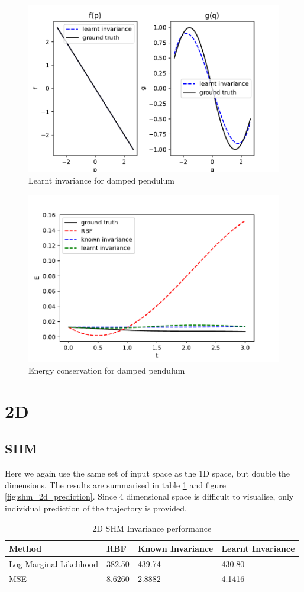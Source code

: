 \documentclass{statsmsc}
\begin{document}
\begin{figure}[H] 
  \includegraphics[width=0.6\linewidth]{../codes/figures/damped_pendulum_learnt.pdf}
  \centering
  \caption{Learnt invariance for damped pendulum}
  \label{fig:damped_pendulum_learnt}
\end{figure}

\begin{figure}[H] 
  \includegraphics[width=0.6\linewidth]{../codes/figures/damped_pendulum_energy.pdf}
  \centering
  \caption{Energy conservation for damped pendulum}
  \label{fig:damped_pendulum_energy}
\end{figure}



\section{2D}
\subsection{SHM}
Here we again use the same set of input space as the 1D space, but double the dimensions. 
The results are summarised in table \ref{tab:SHM_2d_performance} and figure \ref{fig:shm_2d_prediction}.
Since 4 dimensional space is difficult to visualise, only individual prediction of the trajectory is provided. 
\begin{table}[H]
  \centering
  \begin{tabular}{l l l l}
    \hline
Method           & RBF & Known Invariance&  Learnt Invariance\\
  \hline
Log Marginal Likelihood & 382.50 & 439.74 & 430.80  \\
MSE & 8.6260 & 2.8882 & 4.1416 \\
                    \hline
  \end{tabular}
  \caption{2D SHM Invariance performance}
  \label{tab:SHM_2d_performance}
\end{table}
\end{document}
